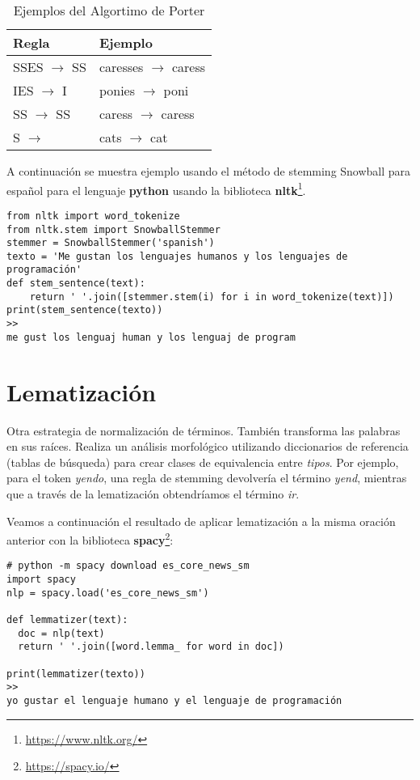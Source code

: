 \begin{table}[h]
\centering
\begin{tabular}{|l|l|}
\hline
Regla & Ejemplo \\
\hline
SSES $\rightarrow$ SS & caresses $\rightarrow$ caress \\
IES $\rightarrow$ I & ponies $\rightarrow$ poni \\
SS $\rightarrow$ SS & caress $\rightarrow$ caress \\
S $\rightarrow$ & cats $\rightarrow$ cat \\
\hline
\end{tabular}
\caption{Ejemplos del Algortimo de Porter}
\label{tab:porter}
\end{table}

A continuación se muestra ejemplo usando el método de stemming Snowball para español para el lenguaje \textbf{python} usando la biblioteca \textbf{nltk}\footnote{\url{https://www.nltk.org/}}.

\begin{verbatim}
from nltk import word_tokenize
from nltk.stem import SnowballStemmer
stemmer = SnowballStemmer('spanish')
texto = 'Me gustan los lenguajes humanos y los lenguajes de programación'
def stem_sentence(text):
    return ' '.join([stemmer.stem(i) for i in word_tokenize(text)])    
print(stem_sentence(texto))
>>
me gust los lenguaj human y los lenguaj de program
\end{verbatim}



\section{Lematización}
Otra estrategia de normalización de términos. También transforma las palabras en sus raíces.  Realiza un análisis morfológico utilizando diccionarios de referencia (tablas de búsqueda) para crear clases de equivalencia entre \emph{tipos}. Por ejemplo, para el token \emph{yendo}, una regla de stemming devolvería el término \emph{yend}, mientras que a través de la lematización obtendríamos el término \emph{ir}.

Veamos a continuación el resultado de aplicar lematización a la misma oración anterior con la biblioteca \textbf{spacy}\footnote{\url{https://spacy.io/}}:

\begin{verbatim}
# python -m spacy download es_core_news_sm
import spacy
nlp = spacy.load('es_core_news_sm')

def lemmatizer(text):  
  doc = nlp(text)
  return ' '.join([word.lemma_ for word in doc])

print(lemmatizer(texto))
>>
yo gustar el lenguaje humano y el lenguaje de programación
\end{verbatim}



